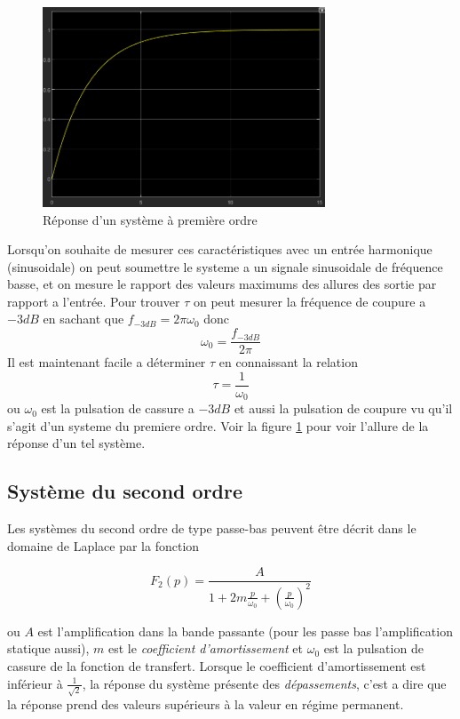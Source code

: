 \documentclass[12pt, a4paper]{report}
\begin{document}
\begin{figure}[h]
    \centering
    \includegraphics[width=0.75\textwidth]{reponse1erordregenerale.png}
    \caption{Réponse d'un système à première ordre}
    \label{fig:reponse1erordre}
\end{figure}

Lorsqu'on souhaite de mesurer ces caractéristiques avec un entrée harmonique (sinusoidale) on peut soumettre le systeme
a un signale sinusoidale de fréquence basse, et on mesure le rapport des valeurs maximums des allures des sortie par rapport a 
l'entrée. Pour trouver $\tau$ on peut mesurer la fréquence de coupure a $-3dB$ en sachant que 
$f_{-3dB} = 2 \pi \omega_{0}$ donc
\[
    \omega_{0} = \frac{f_{-3dB}}{2 \pi}
\]
Il est maintenant facile a déterminer $\tau$ en connaissant la relation
\[
    \tau = \frac{1}{\omega_{0}}
\]
ou $\omega_{0}$ est la pulsation de cassure a $-3dB$ et aussi la pulsation de coupure vu qu'il s'agit 
d'un systeme du premiere ordre. Voir la figure \ref{fig:reponse1erordre} 
pour voir l'allure de la réponse
d'un tel système.



\subsection{Système du second ordre}

Les systèmes du second ordre de type passe-bas peuvent être décrit dans le domaine de Laplace par 
la fonction

\[
  F_{2} (p) =   \frac{A}{1 + 2m \frac{p}{\omega_{0}} + \left( \frac{p}{\omega_{0}} \right)^2}
\]

ou $A$ est l'amplification dans la bande passante (pour les passe bas l'amplification statique aussi), 
$m$ est le \textit{coefficient d'amortissement} et $\omega_{0}$ est la pulsation de cassure de la fonction de 
transfert. Lorsque le coefficient d'amortissement est inférieur à $\frac{1}{\sqrt{2}}$, la réponse du système présente
des \textit{dépassements}, c'est a dire que la réponse prend des valeurs supérieurs à la valeur en régime permanent.
\end{document}
